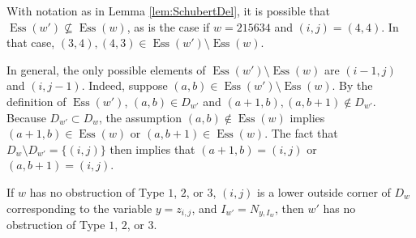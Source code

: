 \documentclass[ALCO,Unicode,published]{cedram}
\DeclareMathOperator{\Ess}{Ess}
\begin{document}
\begin{remark}\label{rem:newEss}
With notation as in Lemma \ref{lem:SchubertDel}, it is possible that $\Ess(w') \not\subseteq \Ess(w)$, as is the case if $w = 215634$ and $(i,j) = (4,4)$.  In that case, $(3,4), (4,3) \in \Ess(w') \setminus \Ess(w)$.  

In general, the only possible elements of $\Ess(w') \setminus \Ess(w)$ are $(i-1,j)$ and $(i,j-1)$.  Indeed, suppose $(a,b) \in \Ess(w') \setminus \Ess(w)$. By the definition of $\Ess(w')$, $(a,b) \in D_{w'}$ and $(a+1,b), (a,b+1) \notin D_{w'}$.  Because $D_{w'} \subset D_w$, the assumption $(a,b) \notin \Ess(w)$ implies $(a+1,b) \in \Ess(w)$ or $(a,b+1) \in \Ess(w)$.  The fact that $D_w \setminus D_{w'} = \{(i,j)\}$ then implies that $(a+1,b) = (i,j)$ or $(a,b+1) = (i,j)$.
\end{remark}

\begin{corollary}\label{cor:GrobnerDel}
If $w$ has no obstruction of Type $1$, $2$, or $3$, $(i,j)$ is a lower outside corner of $D_w$ corresponding to the variable $y = z_{i,j}$, and $I_{w'} =N_{y,I_w}$, then $w'$ has no obstruction of Type $1$, $2$, or $3$.  
\end{corollary}
\end{document}
